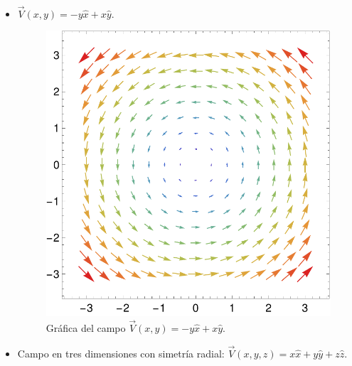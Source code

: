 \begin{ejemplo}
\ 

    \begin{itemize}
        \item $\vec{V}(x,y) = -y \hat{x} + x \hat{y}$.

        \begin{figure}[H]
            \centering
            \includegraphics[scale = 0.45]{Figuras/CampoVectorial1.pdf}
            \caption{Gráfica del campo $\vec{V}(x,y) = -y \hat{x} + x \hat{y}$.}
            \label{fig:Campo_Vectorial1}
        \end{figure}

        \item Campo en tres dimensiones con simetría radial: $\vec{V}(x,y,z) = x \hat{x} + y \hat{y} + z \hat{z}$.


\end{itemize}
\end{ejemplo}
